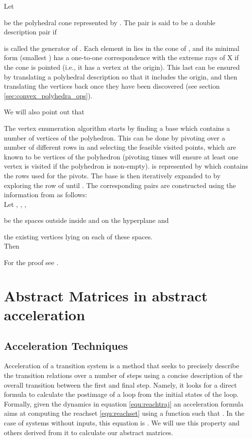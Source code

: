 \documentclass{IEEEtran}
\newcommand{\jrronly}[1]{{}}
\begin{document}
Let 

be the polyhedral cone represented by . 
The pair  is said to be a double description pair if

 is called the generator of .
Each element in  lies in the cone of , and its minimal form (smallest ) has a one-to-one
correspondence with the extreme rays of X if the cone is pointed (i.e., it has a vertex at the origin).
This last can be ensured by translating a polyhedral description so that it includes the origin, and then 
translating the vertices back once they have been discovered (see section \ref{sec:convex_polyhedra_ops}).

We will also point out that


The vertex enumeration algorithm starts by finding a base  which contains a number of
vertices of the polyhedron. This can be done by pivoting over a number of different rows in  and selecting the 
feasible visited points, which are known to be vertices of the polyhedron (pivoting  times will ensure at least one
vertex is visited if the polyhedron is non-empty).  is represented by   which contains the rows 
used for the pivots.
The base  is then iteratively expanded to  by exploring the  row of
 until . The corresponding pairs  are
constructed using the information from  as follows:\\
Let , , ,

be the spaces outside inside and on the  hyperplane and 

the existing vertices lying on each of these spaces.\\
Then 

For the proof see \cite{fukuda1996double}.

\section{Abstract Matrices in abstract acceleration}\label{sec:absacc}


\subsection{Acceleration Techniques}\label{sec:accel}


Acceleration of a transition system is a method that seeks to precisely describe the transition relations over
a number of steps using a concise description of the overall transition between the first and final step. Namely,
it looks for a direct formula to calculate the postimage of a loop from the initial states of the loop.
\jrronly{It may be applied to both continuous and discrete systems using different paradigms.}
Formally, given the dynamics in equation \eqref{equ:reachtraj} an acceleration formula aims at computing
the reachset \eqref{equ:reachset} using a function  such that . In the case
of systems without inputs, this equation is . We will use this property
and others derived from it to calculate our abstract matrices.\\
\end{document}
